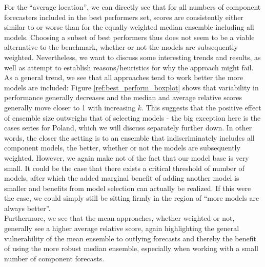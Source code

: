 For the ``average location'', we can directly see that for all numbers of component forecasters included in the best performers set, scores are consistently either similar to or worse than for the equally weighted median ensemble including all models. Choosing a subset of best performers thus does not seem to be a viable alternative to the benchmark, whether or not the models are subsequently weighted. Nevertheless, we want to discuss some interesting trends and results, as well as attempt to establish reasons/heuristics for why the approach might fail.\\
As a general trend, we see that all approaches tend to work better the more models are included: Figure \ref{ref:best_perform_boxplot} shows that variability in performance generally decreases and the median and average relative scores generally move closer to 1 with increasing $k$. This suggests that the positive effect of ensemble size outweighs that of selecting models - the big exception here is the cases series for Poland, which we will discuss separately further down. In other words, the closer the setting is to an ensemble that indiscriminately includes all component models, the better, whether or not the models are subsequently weighted. However, we again make not of the fact that our model base is very small. It could be the case that there exists a critical threshold of number of models, after which the added marginal benefit of adding another model is smaller and benefits from model selection can actually be realized. If this were the case, we could simply still be sitting firmly in the region of ``more models are always better''.\\
Furthermore, we see that the mean approaches, whether weighted or not, generally see a higher average relative score, again highlighting the general vulnerability of the mean ensemble to outlying forecasts and thereby the benefit of using the more robust median ensemble, especially when working with a small number of component forecasts. 
